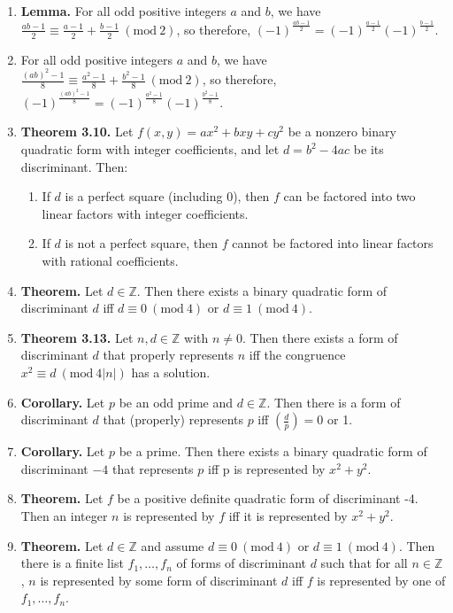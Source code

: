 \documentclass[11pt]{article}
\theoremstyle{definition}
\theoremstyle{named}
\newcommand{\Mod}[1]{\ (\mathrm{mod}\ #1)}
\begin{document}
\begin{enumerate}
\begin{enumerate}
    \end{enumerate}
    \item \textbf{Lemma. } For all odd positive integers $a$ and $b$, we have $\frac{ab-1}{2} \equiv \frac{a-1}{2} + \frac{b-1}{2} \Mod{2}$, so therefore, $(-1)^{\frac{ab-1}{2}} = (-1)^{\frac{a-1}{2}}(-1)^{\frac{b-1}{2}}$. 
    \item For all odd positive integers $a$ and $b$, we have $\frac{(ab)^2 - 1}{8} \equiv \frac{a^2 - 1}{8} + \frac{b^2 - 1}{8} \Mod{2}$, so therefore, $(-1)^{\frac{(ab)^2 - 1}{8}} = (-1)^{\frac{a^2 - 1}{8}}(-1)^{\frac{b^2 - 1}{8}}$. 
    \item \textbf{Theorem 3.10. } Let $f(x,y) = ax^2 + bxy + cy^2$ be a nonzero binary quadratic form with integer coefficients, and let $d = b^2 - 4ac$ be its discriminant. Then: 
    \begin{enumerate}
        \item If $d$ is a perfect square (including $0$), then $f$ can be factored into two linear factors with integer coefficients. 
        \item If $d$ is not a perfect square, then $f$ cannot be factored into linear factors with rational coefficients. 
    \end{enumerate}
    \item \textbf{Theorem. } Let $d \in \mathbb{Z}$. Then there exists a binary quadratic form of discriminant $d$ iff $d \equiv 0 \Mod{4}$ or $d \equiv 1 \Mod{4}$. 
    \item \textbf{Theorem 3.13. } Let $n,d \in \mathbb{Z}$ with $n \neq 0$. Then there exists a form of discriminant $d$ that properly represents $n$ iff the congruence $x^2 \equiv d \Mod{4|n|}$ has a solution. 
    \item \textbf{Corollary. } Let $p$ be an odd prime and $d \in \mathbb{Z}$. Then there is a form of discriminant $d$ that (properly) represents $p$ iff $\left(\frac{d}{p}\right) = 0$ or 1. 
    \item \textbf{Corollary. } Let $p$ be a prime. Then there exists a binary quadratic form of discriminant $-4$ that represents $p$ iff p is represented by $x^2 + y^2$. 
    \item \textbf{Theorem. } Let $f$ be a positive definite quadratic form of discriminant -4. Then an integer $n$ is represented by $f$ iff it is represented by $x^2 + y^2$. 
    \item \textbf{Theorem. } Let $d \in \mathbb{Z}$ and assume $d \equiv 0 \Mod{4}$ or $d \equiv 1 \Mod{4}$. Then there is a finite list $f_1,\dots,f_n$ of forms of discriminant $d$ such that for all $n \in \mathbb{Z}$, $n$ is represented by some form of discriminant $d$ iff $f$ is represented by one of $f_1,\dots,f_n$. 

\end{enumerate}
\end{document}
